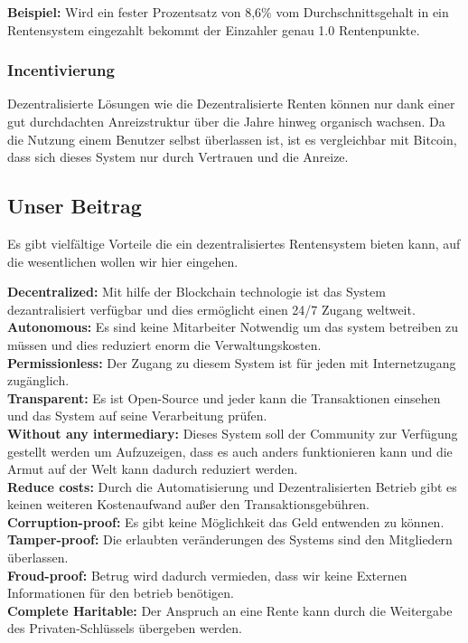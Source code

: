 \textbf{Beispiel:} Wird ein fester Prozentsatz von 8,6\% vom Durchschnittsgehalt in ein Rentensystem eingezahlt bekommt der Einzahler genau 1.0 Rentenpunkte.


\subsubsection*{Incentivierung}


Dezentralisierte Lösungen wie die Dezentralisierte Renten können nur dank einer gut durchdachten Anreizstruktur über die Jahre hinweg organisch wachsen. Da die Nutzung einem Benutzer selbst überlassen ist, ist es vergleichbar mit Bitcoin\cite{bitcoin}, dass sich dieses System nur durch Vertrauen und die Anreize.


\subsection{Unser Beitrag}

Es gibt vielfältige Vorteile die ein dezentralisiertes Rentensystem bieten kann, auf die wesentlichen wollen wir hier eingehen.

\textbf{Decentralized:} Mit hilfe der Blockchain technologie ist das System dezantralisiert verfügbar und dies ermöglicht einen 24/7 Zugang weltweit.\\
\textbf{Autonomous:} Es sind keine Mitarbeiter Notwendig um das system betreiben zu müssen und dies reduziert enorm die Verwaltungskosten.\\
\textbf{Permissionless:} Der Zugang zu diesem System ist für jeden mit Internetzugang zugänglich.\\
\textbf{Transparent:} Es ist Open-Source und jeder kann die Transaktionen einsehen und das System auf seine Verarbeitung prüfen.\\
\textbf{Without any intermediary:} Dieses System soll der Community zur Verfügung gestellt werden um Aufzuzeigen, dass es auch anders funktionieren kann und die Armut auf der Welt kann dadurch reduziert werden.\\
\textbf{Reduce costs:} Durch die Automatisierung und Dezentralisierten Betrieb gibt es keinen weiteren Kostenaufwand außer den Transaktionsgebühren.\\
\textbf{Corruption-proof:} Es gibt keine Möglichkeit das Geld entwenden zu können.\\
\textbf{Tamper-proof:} Die erlaubten veränderungen des Systems sind den Mitgliedern überlassen.\\
\textbf{Froud-proof:}
Betrug wird dadurch vermieden, dass wir keine Externen Informationen für den betrieb benötigen. \\
\textbf{Complete Haritable:}
Der Anspruch an eine Rente kann durch die Weitergabe des Privaten-Schlüssels übergeben werden.